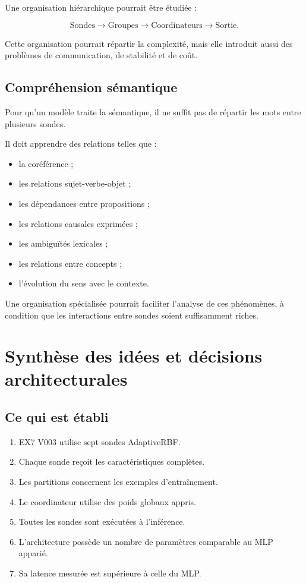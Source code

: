 \documentclass[11pt,a4paper]{report}
\begin{document}
Une organisation hiérarchique pourrait être étudiée :

\[
\text{Sondes}
\rightarrow
\text{Groupes}
\rightarrow
\text{Coordinateurs}
\rightarrow
\text{Sortie}.
\]

Cette organisation pourrait répartir la complexité,
mais elle introduit aussi des problèmes de communication,
de stabilité et de coût.

\section{Compréhension sémantique}

Pour qu'un modèle traite la sémantique, il ne suffit pas
de répartir les mots entre plusieurs sondes.

Il doit apprendre des relations telles que :

\begin{itemize}
  \item la coréférence ;
  \item les relations sujet-verbe-objet ;
  \item les dépendances entre propositions ;
  \item les relations causales exprimées ;
  \item les ambiguïtés lexicales ;
  \item les relations entre concepts ;
  \item l'évolution du sens avec le contexte.
\end{itemize}

Une organisation spécialisée pourrait faciliter
l'analyse de ces phénomènes, à condition que les
interactions entre sondes soient suffisamment riches.

\chapter{Synthèse des idées et décisions architecturales}

\section{Ce qui est établi}

\begin{enumerate}
  \item EX7 V003 utilise sept sondes AdaptiveRBF.
  \item Chaque sonde reçoit les caractéristiques complètes.
  \item Les partitions concernent les exemples d'entraînement.
  \item Le coordinateur utilise des poids globaux appris.
  \item Toutes les sondes sont exécutées à l'inférence.
  \item L'architecture possède un nombre de paramètres
  comparable au MLP apparié.
  \item Sa latence mesurée est supérieure à celle du MLP.
\end{enumerate}
\end{document}
